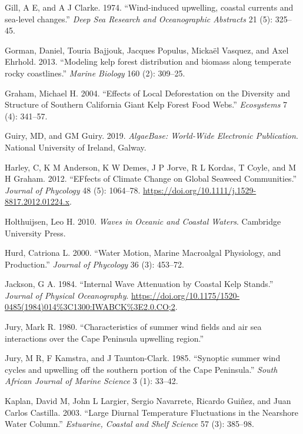 \documentclass[
  a4paper,
]{article}
\begin{document}
\leavevmode\hypertarget{ref-Gill1974-nt}{}%
Gill, A E, and A J Clarke. 1974. ``Wind-induced upwelling, coastal
currents and sea-level changes.'' \emph{Deep Sea Research and
Oceanographic Abstracts} 21 (5): 325--45.

\leavevmode\hypertarget{ref-Gorman2013-nj}{}%
Gorman, Daniel, Touria Bajjouk, Jacques Populus, Mickaël Vasquez, and
Axel Ehrhold. 2013. ``Modeling kelp forest distribution and biomass
along temperate rocky coastlines.'' \emph{Marine Biology} 160 (2):
309--25.

\leavevmode\hypertarget{ref-graham2004}{}%
Graham, Michael H. 2004. ``Effects of Local Deforestation on the
Diversity and Structure of Southern California Giant Kelp Forest Food
Webs.'' \emph{Ecosystems} 7 (4): 341--57.

\leavevmode\hypertarget{ref-Algaebase}{}%
Guiry, MD, and GM Guiry. 2019. \emph{AlgaeBase: World-Wide Electronic
Publication}. National University of Ireland, Galway.

\leavevmode\hypertarget{ref-Harley2012}{}%
Harley, C, K M Anderson, K W Demes, J P Jorve, R L Kordas, T Coyle, and
M H Graham. 2012. ``EFfects of Climate Change on Global Seaweed
Communities.'' \emph{Journal of Phycology} 48 (5): 1064--78.
\url{https://doi.org/10.1111/j.1529-8817.2012.01224.x}.

\leavevmode\hypertarget{ref-Holthuijsen2010-vl}{}%
Holthuijsen, Leo H. 2010. \emph{Waves in Oceanic and Coastal Waters}.
Cambridge University Press.

\leavevmode\hypertarget{ref-Hurd2000}{}%
Hurd, Catriona L. 2000. ``Water Motion, Marine Macroalgal Physiology,
and Production.'' \emph{Journal of Phycology} 36 (3): 453--72.

\leavevmode\hypertarget{ref-Jackson1984}{}%
Jackson, G A. 1984. ``Internal Wave Attenuation by Coastal Kelp
Stands.'' \emph{Journal of Physical Oceanography}.
\url{https://doi.org/10.1175/1520-0485(1984)014\%3C1300:IWABCK\%3E2.0.CO;2}.

\leavevmode\hypertarget{ref-Jury1980-ov}{}%
Jury, Mark R. 1980. ``Characteristics of summer wind fields and air sea
interactions over the Cape Peninsula upwelling region.''

\leavevmode\hypertarget{ref-Jury1985-nr}{}%
Jury, M R, F Kamstra, and J Taunton-Clark. 1985. ``Synoptic summer wind
cycles and upwelling off the southern portion of the Cape Peninsula.''
\emph{South African Journal of Marine Science} 3 (1): 33--42.

\leavevmode\hypertarget{ref-Kaplan2003}{}%
Kaplan, David M, John L Largier, Sergio Navarrete, Ricardo Guiñez, and
Juan Carlos Castilla. 2003. ``Large Diurnal Temperature Fluctuations in
the Nearshore Water Column.'' \emph{Estuarine, Coastal and Shelf
Science} 57 (3): 385--98.
\end{document}
